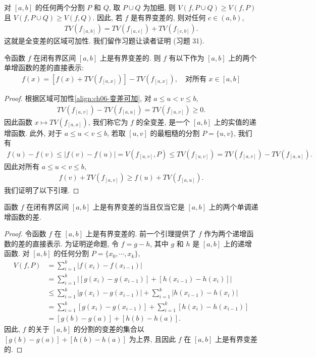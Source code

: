 \documentclass[../../main.tex]{subfiles}
\begin{document}
对 $[a,b]$ 的任何两个分割 $P$ 和 $Q$, 取 $P\cup Q$ 为加细, 则 $V(f,P\cup Q)\geqslant V(f,P)$ 且 $V(f,P\cup Q)\geqslant V(f,Q)$. 因此, 若 $f$ 是有界变差的, 则对任何 $c\in(a,b)$,
\begin{align}
TV(f_{[a,b]})=TV(f_{[a,c]})+TV(f_{[c,b]}).\label{align:ch06-变差可加}
\end{align}
这就是全变差的区域可加性. 我们留作习题让读者证明 (习题 31).

\begin{lemma}\label{lemma:ch06-变差引理}
令函数 $f$ 在闭有界区间 $[a,b]$ 上是有界变差的. 则 $f$ 有以下作为 $[a,b]$ 上的两个单增函数的差的直接表示:
\begin{align}
f(x)=[f(x)+TV(f_{[a,x]})]-TV(f_{[a,x]}),\quad\text{对所有 }x\in[a,b]\label{align:ch06-直接表示}
\end{align}
\end{lemma}

\begin{proof}
根据区域可加性\eqref{align:ch06-变差可加}, 对 $a\leqslant u<v\leqslant b$,
\begin{align}
TV(f_{[a,v]})-TV(f_{[a,u]})=TV(f_{[u,v]})\geqslant 0.\label{align:ch06-变差递增}
\end{align}
因此函数 $x\mapsto TV(f_{[a,x]})$, 我们称它为 $f$ 的全变差, 是一个 $[a,b]$ 上的实值的递增函数. 此外, 对于 $a\leqslant u<v\leqslant b$, 若取 $[u,v]$ 的最粗糙的分割 $P=\{u,v\}$, 我们有
\begin{align*}
f(u)-f(v)\leqslant|f(v)-f(u)|=V(f_{[u,v]},P)\leqslant TV(f_{[u,v]})=TV(f_{[a,v]})-TV(f_{[a,u]}).
\end{align*}
因此对所有 $a\leqslant u<v\leqslant b$,
\begin{align}
f(v)+TV(f_{[a,v]})\geqslant f(u)+TV(f_{[a,u]}).\label{align:ch06-和递增}
\end{align}
我们证明了以下引理.
\end{proof}

\begin{theorem}[Jordan 定理]\label{theorem:ch06-Jordan}
函数 $f$ 在闭有界区间 $[a,b]$ 上是有界变差的当且仅当它是 $[a,b]$ 上的两个单调递增函数的差.
\end{theorem}

\begin{proof}
令函数 $f$ 在 $[a,b]$ 上是有界变差的. 前一个引理提供了 $f$ 作为两个递增函数的差的直接表示. 为证明逆命题, 令 $f=g-h$, 其中 $g$ 和 $h$ 是 $[a,b]$ 上的递增函数. 对 $[a,b]$ 的任何分割 $P=\{x_{0},\cdots,x_{k}\}$,
\begin{align*}
V(f,P)&=\sum_{i=1}^{k}|f(x_{i})-f(x_{i-1})|\\
&=\sum_{i=1}^{k}|[g(x_{i})-g(x_{i-1})]+[h(x_{i-1})-h(x_{i})]|\\
&\leqslant\sum_{i=1}^{k}|g(x_{i})-g(x_{i-1})|+\sum_{i=1}^{k}|h(x_{i-1})-h(x_{i})|\\
&=\sum_{i=1}^{k}[g(x_{i})-g(x_{i-1})]+\sum_{i=1}^{k}[h(x_{i})-h(x_{i-1})]\\
&=[g(b)-g(a)]+[h(b)-h(a)].
\end{align*}
因此, $f$ 的关于 $[a,b]$ 的分割的变差的集合以 $[g(b)-g(a)]+[h(b)-h(a)]$ 为上界, 且因此 $f$ 在 $[a,b]$ 上是有界变差的.
\end{proof}
\end{document}
